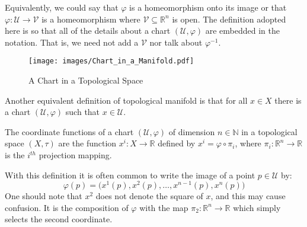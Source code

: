         Equivalently, we could say that $\varphi$ is a homeomorphism onto its
        image or that $\varphi:\mathcal{U}\rightarrow\mathcal{V}$ is a
        homeomorphism where $\mathcal{V}\subseteq\mathbb{R}^{n}$ is open. The
        definition adopted here is so that all of the details about a chart
        $(\mathcal{U},\varphi)$ are embedded in the notation. That is, we need
        not add a $\mathcal{V}$ nor talk about $\varphi^{\minus{1}}$.
        \begin{figure}[H]
            \centering
            \captionsetup{type=figure}
            \texttt{[image: images/Chart\_in\_a\_Manifold.pdf]}
            \caption{A Chart in a Topological Space}
            \label{fig:Chart_in_Topological_Space}
        \end{figure}
        Another equivalent definition of topological manifold is that for all
        $x\in{X}$ there is a chart $(\mathcal{U},\varphi)$ such that
        $x\in\mathcal{U}$.
        \begin{definition}
            The coordinate functions of a chart $(\mathcal{U},\varphi)$ of
            dimension $n\in\mathbb{N}$ in a topological space $(X,\tau)$
            are the function $x^{i}:X\rightarrow\mathbb{R}$ defined by
            $x^{i}=\varphi\circ\pi_{i}$, where
            $\pi_{i}:\mathbb{R}^{n}\rightarrow\mathbb{R}$ is the $i^{th}$
            projection mapping.
        \end{definition}
        With this definition it is often common to write the image of a point
        $p\in\mathcal{U}$ by:
        \begin{equation}
            \varphi(p)=\big(x^{1}(p),x^{2}(p),\dots,x^{n-1}(p),x^{n}(p)\big)
        \end{equation}
        One should note that $x^{2}$ does not denote the square of $x$, and this
        may cause confusion. It is the composition of $\varphi$ with the map
        $\pi_{2}:\mathbb{R}^{n}\rightarrow\mathbb{R}$ which simply selects the
        second coordinate.
